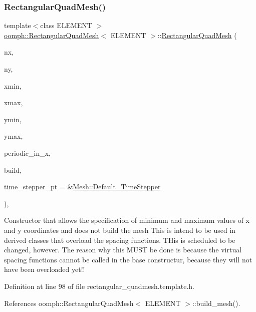 \subsubsection{\texorpdfstring{Rectangular\+Quad\+Mesh()}{RectangularQuadMesh()}\hspace{0.1cm}{\footnotesize\ttfamily [1/5]}}
{\footnotesize\ttfamily template$<$class E\+L\+E\+M\+E\+NT $>$ \\
\hyperlink{classoomph_1_1RectangularQuadMesh}{oomph\+::\+Rectangular\+Quad\+Mesh}$<$ E\+L\+E\+M\+E\+NT $>$\+::\hyperlink{classoomph_1_1RectangularQuadMesh}{Rectangular\+Quad\+Mesh} (\begin{DoxyParamCaption}\item[{const unsigned \&}]{nx,  }\item[{const unsigned \&}]{ny,  }\item[{const double \&}]{xmin,  }\item[{const double \&}]{xmax,  }\item[{const double \&}]{ymin,  }\item[{const double \&}]{ymax,  }\item[{const bool \&}]{periodic\+\_\+in\+\_\+x,  }\item[{const bool \&}]{build,  }\item[{\hyperlink{classoomph_1_1TimeStepper}{Time\+Stepper} $\ast$}]{time\+\_\+stepper\+\_\+pt = {\ttfamily \&\hyperlink{classoomph_1_1Mesh_a12243d0fee2b1fcee729ee5a4777ea10}{Mesh\+::\+Default\+\_\+\+Time\+Stepper}} }\end{DoxyParamCaption})\hspace{0.3cm}{\ttfamily [inline]}, {\ttfamily [protected]}}



Constructor that allows the specification of minimum and maximum values of x and y coordinates and does not build the mesh This is intend to be used in derived classes that overload the spacing functions. T\+His is scheduled to be changed, however. The reason why this M\+U\+ST be done is because the virtual spacing functions cannot be called in the base constructur, because they will not have been overloaded yet!! 



Definition at line 98 of file rectangular\+\_\+quadmesh.\+template.\+h.



References oomph\+::\+Rectangular\+Quad\+Mesh$<$ E\+L\+E\+M\+E\+N\+T $>$\+::build\+\_\+mesh().

\mbox{\label{classoomph_1_1RectangularQuadMesh_a1f906bca42da3d44765382013667e40d}} 

